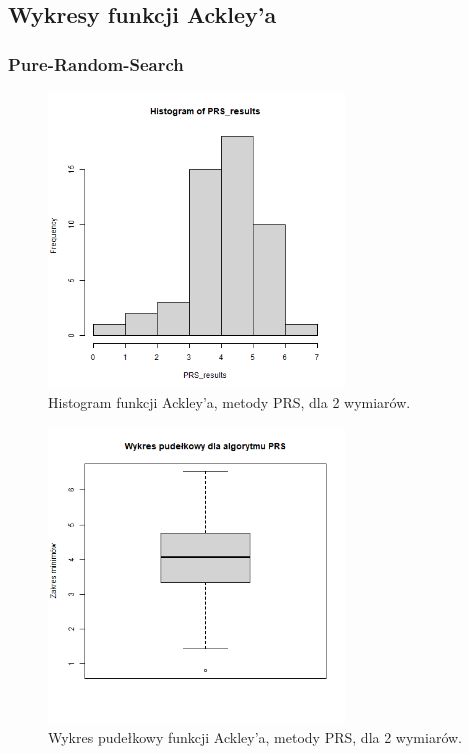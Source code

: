 \documentclass{lab}
\begin{document}
\subsection{Wykresy funkcji Ackley’a}
\subsubsection{Pure-Random-Search}
\begin{figure}[H]
  \centering
  \includegraphics[width=0.7\textwidth]{img/dim2_PRS_Ackley_his.png}
  \caption{Histogram funkcji Ackley'a, metody PRS, dla 2 wymiarów.}
\end{figure}
\begin{figure}[H]
  \centering
  \includegraphics[width=0.7\textwidth]{img/dim2_PRS_Ackley.png}
  \caption{Wykres pudełkowy funkcji Ackley'a, metody PRS, dla 2 wymiarów.}
\end{figure}
\end{document}
